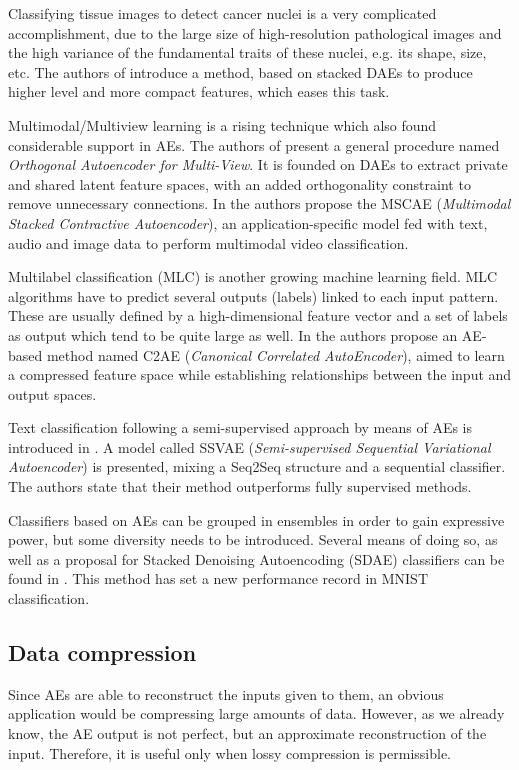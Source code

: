 Classifying tissue images to detect cancer nuclei is a very complicated accomplishment, due to the large size of high-resolution pathological images and the high variance of the fundamental traits of these nuclei, e.g. its shape, size, etc. The authors of  introduce a method, based on stacked DAEs to produce higher level and more compact features, which eases this task.

Multimodal/Multiview learning  is a rising technique which also found considerable support in AEs. The authors of  present a general procedure named \textit{Orthogonal Autoencoder for Multi-View}. It is founded on DAEs to extract private and shared latent feature spaces, with an added orthogonality constraint to remove unnecessary connections. In  the authors propose the MSCAE (\textit{Multimodal Stacked Contractive Autoencoder}), an application-specific model fed with text, audio and image data to perform multimodal video classification. 

Multilabel classification  (MLC) is another growing machine learning field. MLC algorithms have to predict several outputs (labels) linked to each input pattern. These are usually defined by a high-dimensional feature vector and a set of labels as output which tend to be quite large as well. In  the authors propose an AE-based method named C2AE (\textit{Canonical Correlated AutoEncoder}), aimed to learn a compressed feature space while establishing relationships between the input and output spaces.

Text classification following a semi-supervised approach by means of AEs is introduced in . A model called SSVAE (\textit{Semi-supervised Sequential Variational Autoencoder}) is presented, mixing a Seq2Seq  structure and a sequential classifier. The authors state that their method outperforms fully supervised methods.

Classifiers based on AEs can be grouped in ensembles in order to gain expressive power, but some diversity needs to be introduced. Several means of doing so, as well as a proposal for Stacked Denoising Autoencoding (SDAE) classifiers can be found in . This method has set a new performance record in MNIST classification.


\subsection{Data compression}
Since AEs are able to reconstruct the inputs given to them, an obvious application would be compressing large amounts of data. However, as we already know, the AE output is not perfect, but an approximate reconstruction of the input. Therefore, it is useful only when lossy compression is permissible. 


